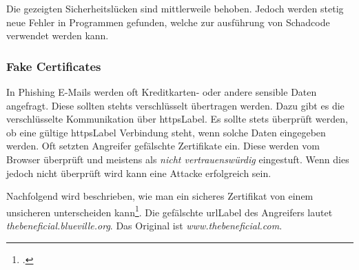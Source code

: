 Die gezeigten Sicherheitslücken sind mittlerweile behoben. Jedoch werden stetig neue Fehler in Programmen gefunden, welche zur ausführung von Schadcode verwendet werden kann.

\subsubsection{Fake Certificates}
In Phishing E-Mails werden oft Kreditkarten- oder andere sensible Daten angefragt. Diese sollten stehts verschlüsselt übertragen werden. Dazu gibt es die verschlüsselte Kommunikation über \Gls{httpsLabel}. Es sollte stets überprüft werden, ob eine gültige \Gls{httpsLabel} Verbindung steht, wenn solche Daten eingegeben werden. Oft setzten Angreifer gefälschte Zertifikate ein. Diese werden vom Browser überprüft und meistens als \textit{nicht vertrauenswürdig} eingestuft. Wenn dies jedoch nicht überprüft wird kann eine Attacke erfolgreich sein.

Nachfolgend wird beschrieben, wie man ein sicheres Zertifikat von einem unsicheren unterscheiden kann\footcite{Phishing_and_Certificates_2015-05-23}. Die gefälschte \Gls{urlLabel} des Angreifers lautet \textit{thebeneficial.blueville.org}. Das Original ist \textit{www.thebeneficial.com}.

